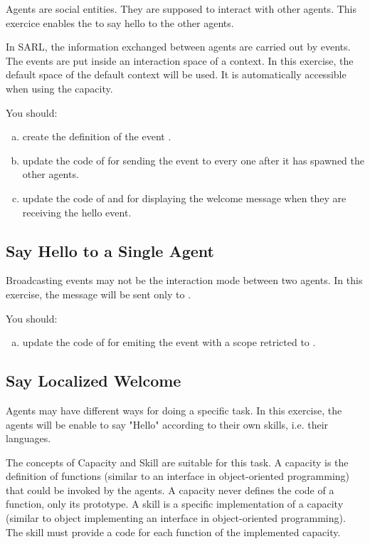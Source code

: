 \documentclass[article,english,nodocumentinfo]{utbmciadreport}
\begin{document}
Agents are social entities. They are supposed to interact with other agents.
This exercice enables the  to say hello to the other agents.

In SARL, the information exchanged between agents are carried out by events.
The events are put inside an interaction space of a context.
In this exercise, the default space of the default context will be used.
It is automatically accessible when using the  capacity.

You should:
\begin{enumerate}[a)]
\item create the definition of the event .
\item update the code of  for sending the event to every one after it has spawned the other agents.
\item update the code of  and  for displaying the welcome message when they are receiving the hello event.
\end{enumerate}

\subsection{Say Hello to a Single Agent}

Broadcasting events may not be the interaction mode between two agents.
In this exercise, the  message will be sent only to .

You should:
\begin{enumerate}[a)]
\item update the code of  for emiting the event with a scope retricted to .
\end{enumerate}

\subsection{Say Localized Welcome}

Agents may have different ways for doing a specific task.
In this exercise, the agents will be enable to say "Hello" according to their own skills, i.e. their languages.

The concepts of Capacity and Skill are suitable for this task.
A capacity is the definition of functions (similar to an interface in object-oriented programming) that could be invoked by the agents. A capacity never defines the code of a function, only its prototype.
A skill is a specific implementation of a capacity (similar to object implementing an interface in object-oriented programming). The skill must provide a code for each function of the implemented capacity.
\end{document}
